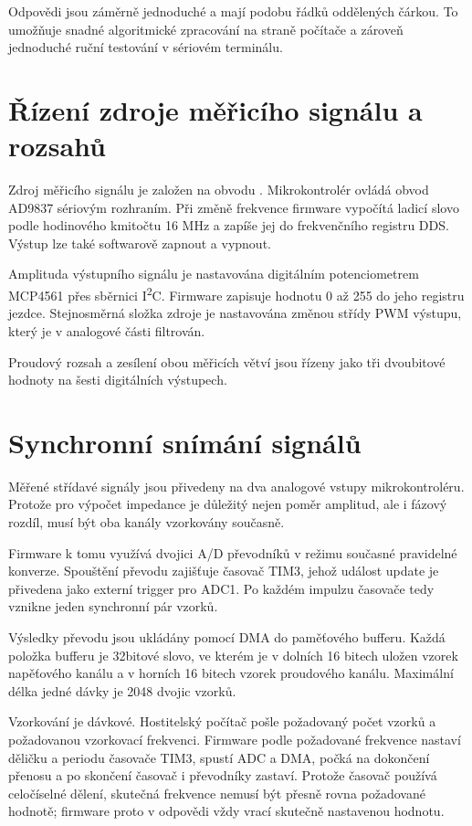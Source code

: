 Odpovědi jsou záměrně jednoduché a mají podobu řádků oddělených čárkou. 
To umožňuje snadné algoritmické zpracování na straně počítače a zároveň jednoduché ruční testování v sériovém terminálu.

\section{Řízení zdroje měřicího signálu a rozsahů}

Zdroj měřicího signálu je založen na obvodu . 
Mikrokontrolér ovládá obvod AD9837 sériovým rozhraním. 
Při změně frekvence firmware vypočítá ladicí slovo podle hodinového kmitočtu 16 MHz 
a zapíše jej do frekvenčního registru DDS. 
Výstup lze také softwarově zapnout a vypnout.

Amplituda výstupního signálu je nastavována digitálním potenciometrem MCP4561 přes sběrnici I\textsuperscript{2}C. 
Firmware zapisuje hodnotu 0 až 255 do jeho registru jezdce. 
Stejnosměrná složka zdroje je nastavována změnou střídy PWM výstupu, který je v analogové části filtrován.

Proudový rozsah a zesílení obou měřicích větví jsou řízeny jako tři dvoubitové hodnoty na šesti digitálních výstupech. 


\section{Synchronní snímání signálů}

Měřené střídavé signály jsou přivedeny na dva analogové vstupy mikrokontroléru. 
Protože pro výpočet impedance je důležitý nejen poměr amplitud, ale i fázový rozdíl,
musí být oba kanály vzorkovány současně.

Firmware k tomu využívá dvojici \acs{A/D} převodníků v režimu současné pravidelné konverze. 
Spouštění převodu zajišťuje časovač TIM3, jehož událost update je přivedena jako externí trigger pro ADC1. 
Po každém impulzu časovače tedy vznikne jeden synchronní pár vzorků.

Výsledky převodu jsou ukládány pomocí \acs{DMA} do paměťového bufferu. 
Každá položka bufferu je 32bitové slovo, ve kterém je v dolních 16 bitech uložen vzorek napěťového kanálu a v horních 16 bitech vzorek proudového kanálu. 
Maximální délka jedné dávky je 2048 dvojic vzorků.

Vzorkování je dávkové. 
Hostitelský počítač pošle požadovaný počet vzorků a požadovanou vzorkovací frekvenci. 
Firmware podle požadované frekvence nastaví děličku a periodu časovače TIM3, spustí ADC a DMA, 
počká na dokončení přenosu a po skončení časovač i převodníky zastaví. 
Protože časovač používá celočíselné dělení, skutečná frekvence nemusí být přesně rovna požadované hodnotě; 
firmware proto v odpovědi vždy vrací skutečně nastavenou hodnotu.

